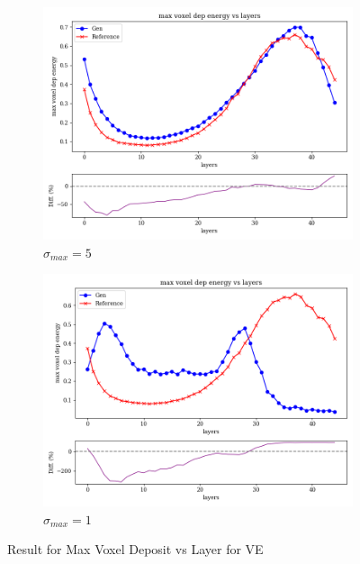 \begin{figure}[bthp]
\begin{subfigure}[b]{0.23\textwidth}
        \centering
        \includegraphics[width=\textwidth]{Figures/ve5_5.png}
        \caption{$\sigma_{max}=5$}
        \label{fig:ve5_5}
    \end{subfigure}
    \hfill
    \begin{subfigure}[b]{0.23\textwidth}  %
        \centering
        \includegraphics[width=\textwidth]{Figures/ve1_5.png}
        \caption{$\sigma_{max}=1$}
        \label{fig:ve1_5}
    \end{subfigure}
    \caption{Result for Max Voxel Deposit vs Layer for VE}
\end{figure}

